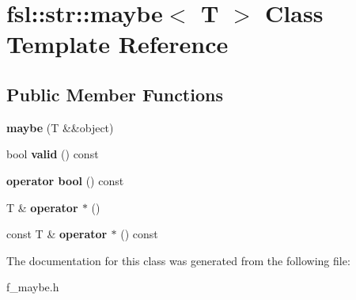 \hypertarget{classfsl_1_1str_1_1maybe}{}\section{fsl\+::str\+::maybe$<$ T $>$ Class Template Reference}
\label{classfsl_1_1str_1_1maybe}
\subsection*{Public Member Functions}
\begin{DoxyCompactItemize}
\item 
\mbox{\label{classfsl_1_1str_1_1maybe_aef4aba35a8cd636d61891283004db439}} 
{\bfseries maybe} (T \&\&object)
\item 
\mbox{\label{classfsl_1_1str_1_1maybe_aca16788fcd99ebbb2b7691bdbdcb7d5a}} 
bool {\bfseries valid} () const
\item 
\mbox{\label{classfsl_1_1str_1_1maybe_a53b8b055264c3fa6f792f6fea3d66634}} 
{\bfseries operator bool} () const
\item 
\mbox{\label{classfsl_1_1str_1_1maybe_a9ac528e999974348895dd5eae8de4021}} 
T \& {\bfseries operator $\ast$} ()
\item 
\mbox{\label{classfsl_1_1str_1_1maybe_ad9e05734ad627e6adf37994d44d8c2f4}} 
const T \& {\bfseries operator $\ast$} () const
\end{DoxyCompactItemize}


The documentation for this class was generated from the following file\+:\begin{DoxyCompactItemize}
\item 
f\+\_\+maybe.\+h\end{DoxyCompactItemize}
